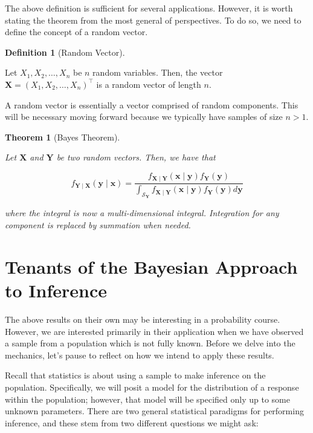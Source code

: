 \documentclass[
  letterpaper,
  DIV=11,
  numbers=noendperiod]{scrreprt}
\theoremstyle{definition}
\newtheorem{definition}{Definition}[chapter]
\theoremstyle{plain}
\newtheorem{theorem}{Theorem}[chapter]
\theoremstyle{definition}
\theoremstyle{remark}
\begin{document}
The above definition is sufficient for several applications. However, it
is worth stating the theorem from the most general of perspectives. To
do so, we need to define the concept of a random vector.

\begin{definition}[Random
Vector]\protect\hypertarget{def-random-vector}{}\label{def-random-vector}

Let \(X_1, X_2, \dots, X_n\) be \(n\) random variables. Then, the vector
\(\mathbf{X} = \left(X_1, X_2, \dots, X_n\right)^\top\) is a random
vector of length \(n\).

\end{definition}

A random vector is essentially a vector comprised of random components.
This will be necessary moving forward because we typically have samples
of size \(n > 1\).

\begin{theorem}[Bayes
Theorem]\protect\hypertarget{thm-bayes-rule}{}\label{thm-bayes-rule}

Let \(\mathbf{X}\) and \(\mathbf{Y}\) be two random \emph{vectors}.
Then, we have that

\[f_{\mathbf{Y} \mid \mathbf{X}}(\mathbf{y} \mid \mathbf{x}) = \frac{f_{\mathbf{X} \mid \mathbf{Y}}(\mathbf{x} \mid \mathbf{y}) f_{\mathbf{Y}}(\mathbf{y})}{\int_{\mathcal{S}_\mathbf{Y}} f_{\mathbf{X} \mid \mathbf{Y}}(\mathbf{x} \mid \mathbf{y}) f_{\mathbf{Y}}(\mathbf{y}) d\mathbf{y}}\]

where the integral is now a multi-dimensional integral. Integration for
any component is replaced by summation when needed.

\end{theorem}

\hypertarget{tenants-of-the-bayesian-approach-to-inference}{%
\section{Tenants of the Bayesian Approach to
Inference}\label{tenants-of-the-bayesian-approach-to-inference}}

The above results on their own may be interesting in a probability
course. However, we are interested primarily in their application when
we have observed a sample from a population which is not fully known.
Before we delve into the mechanics, let's pause to reflect on how we
intend to apply these results.

Recall that statistics is about using a sample to make inference on the
population. Specifically, we will posit a model for the distribution of
a response within the population; however, that model will be specified
only up to some unknown parameters. There are two general statistical
paradigms for performing inference, and these stem from two different
questions we might ask:
\end{document}
